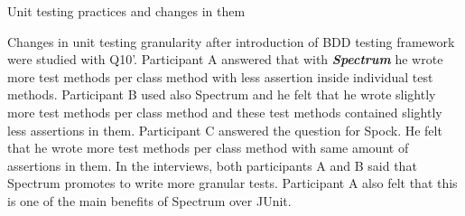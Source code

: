     \begin{table}[H]
             \caption {Unit testing practices and changes in them} \label{tab:changes-pt8}
     \end{table}

Changes in unit testing granularity after introduction of BDD testing framework were studied with Q10'. Participant A
answered that with \textbf{\textit{Spectrum}} he wrote more test methods per class method with less assertion inside individual
test methods. Participant B used also Spectrum and he felt that he wrote slightly more test methods per class method and
these test methods contained slightly less assertions in them.
Participant C answered the question for Spock. He felt that he wrote more test methods per class method with same amount of assertions in them.
In the interviews, both participants A and B said that
Spectrum promotes to write more granular tests. Participant A also felt that this is one of the main benefits of Spectrum over
JUnit.

